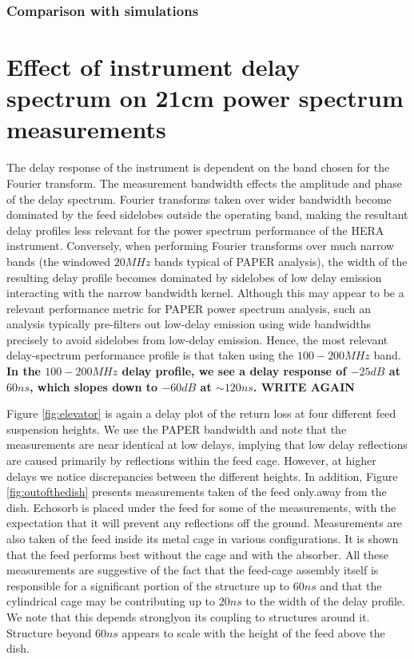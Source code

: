 \documentclass[twocolumn]{emulateapj}
\begin{document}
\subsubsection{Comparison with simulations}
\section{Effect of instrument delay spectrum on 21cm power spectrum measurements }

The delay response of the instrument is dependent on the band chosen for the Fourier transform.
The measurement bandwidth effects the amplitude and phase of the delay spectrum. Fourier transforms taken over wider bandwidth
become dominated by the feed sidelobes outside the operating band, making the resultant delay profiles less relevant
for the power spectrum performance of the HERA instrument.  Conversely, when performing Fourier transforms over much 
narrow bands (the windowed $20MHz$ bands typical of PAPER analysis), the width of the resulting delay profile
becomes dominated by sidelobes of low delay emission interacting with the narrow bandwidth kernel.  
Although this may appear to be a relevant performance metric for PAPER power spectrum analysis, such an analysis typically pre-filters out low-delay emission using wide bandwidths precisely to avoid sidelobes from low-delay emission.  Hence, the most relevant delay-spectrum performance profile is that taken using the $100-200MHz$ band. \textbf{In the $100-200MHz$ delay profile, we see a delay response of $-25dB$ at $60ns$, which slopes down to $-60dB$ at $\sim120ns$.  WRITE AGAIN}


Figure \ref{fig:elevator} is again a delay plot of the return loss at four different feed suspension heights. 
We use the PAPER bandwidth and note
that the measurements are near identical at low delays, implying that low delay reflections are caused primarily by reflections within the feed cage. 
However, at higher delays we notice discrepancies between the different heights.
In addition, Figure \ref{fig:outofthedish} presents measurements taken of the feed only.away from the dish. Echosorb is placed under the feed for some of the
measurements, with the expectation that it will prevent any reflections off the
ground.
 Measurements are also taken of the feed inside its metal cage in various configurations. It is shown that the feed performs best without the cage and with the absorber. 
All these measurements are suggestive of the  fact that the feed-cage assembly itself is responsible for a significant portion of the structure up to $60ns$ and
that the cylindrical cage may be contributing up to $20ns$ to the width of the delay profile. 
We note that this depends stronglyon its coupling to structures around it. 
Structure beyond $60ns$ appears to scale with the height of the feed above the dish.
\end{document}
